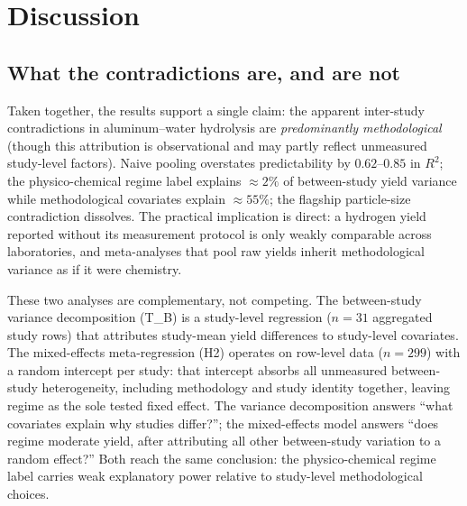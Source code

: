 \section{Discussion}

\subsection{What the contradictions are, and are not}

Taken together, the results support a single claim: the apparent inter-study contradictions
in aluminum--water hydrolysis are \emph{predominantly methodological} (though this attribution is observational and
may partly reflect unmeasured study-level factors). Naive pooling
overstates predictability by $0.62$--$0.85$ in $R^2$; the physico-chemical regime label
explains $\approx\!2\%$ of between-study yield variance while methodological covariates
explain $\approx\!55\%$; the flagship particle-size contradiction dissolves. The practical
implication is direct: a hydrogen yield reported without its measurement protocol is only
weakly comparable across laboratories, and meta-analyses that pool raw yields inherit
methodological variance as if it were chemistry.

These two analyses are complementary, not competing. The between-study variance
decomposition (T\_B) is a study-level regression ($n\!=\!31$ aggregated study rows) that
attributes study-mean yield differences to study-level covariates. The mixed-effects
meta-regression (H2) operates on row-level data ($n\!=\!299$) with a random intercept
per study: that intercept absorbs all unmeasured between-study heterogeneity, including
methodology and study identity together, leaving regime as the sole tested fixed effect.
The variance decomposition answers ``what covariates explain why studies differ?''; the
mixed-effects model answers ``does regime moderate yield, after attributing all other
between-study variation to a random effect?'' Both reach the same conclusion: the
physico-chemical regime label carries weak explanatory power relative to study-level
methodological choices.

